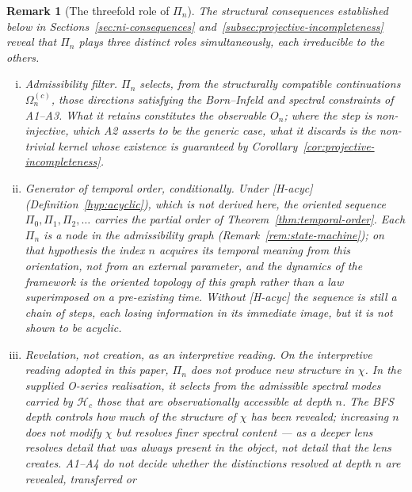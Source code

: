 \documentclass[11pt,a4paper]{article}
\newtheorem{remark}[theorem]{Remark}
\begin{document}
    \begin{remark}[The threefold role of $\Pi_n$]
      \label{rem:pi-threefold}
      The structural consequences established below in Sections~\ref{sec:ni-consequences}
      and~\ref{subsec:projective-incompleteness} reveal that $\Pi_n$ plays three
      distinct roles simultaneously, each irreducible to the others.
      \begin{enumerate}[(i)]
        \item \emph{Admissibility filter.}
        $\Pi_n$ selects, from the structurally compatible continuations
        $\Omega_n^{(c)}$, those directions satisfying the Born--Infeld and spectral
        constraints of A1--A3.
        What it retains constitutes the observable $O_n$; where the step is non-injective, which
        A2 asserts to be the generic case, what it discards is the non-trivial kernel whose
        existence is guaranteed by Corollary~\ref{cor:projective-incompleteness}.
        \item \emph{Generator of temporal order, conditionally.}
        Under \textup{[H-acyc]} (Definition~\ref{hyp:acyclic}), which is not derived here, the
        oriented sequence $\Pi_0, \Pi_1, \Pi_2, \ldots$ carries the partial order of
        Theorem~\ref{thm:temporal-order}.
        Each $\Pi_n$ is a node in the admissibility graph
        (Remark~\ref{rem:state-machine}); on that hypothesis the index $n$ acquires its temporal
        meaning from this orientation, not from an external parameter, and the dynamics of the
        framework is the oriented topology of this graph rather than a law superimposed on a
        pre-existing time.
        Without \textup{[H-acyc]} the sequence is still a chain of steps, each losing information
        in its immediate image, but it is not shown to be acyclic.
        \item \emph{Revelation, not creation, as an interpretive reading.}
        On the interpretive reading adopted in this paper, $\Pi_n$ does not produce new structure in $\chi$.
        In the supplied O-series realisation, it selects from the admissible
        spectral modes carried by $\mathcal{H}_c$ those that are observationally
        accessible at depth $n$.
        The BFS depth controls how much of the structure of $\chi$ has been
        revealed; increasing $n$ does not modify $\chi$ but resolves finer spectral
        content — as a deeper lens resolves detail that was always present in the
        object, not detail that the lens creates.
        A1--A4 do not decide whether the distinctions resolved at depth $n$ are revealed, transferred or

\end{enumerate}
\end{remark}
\end{document}
